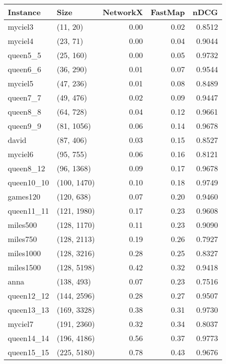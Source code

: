 \begin{tabular}{llrrr}
\toprule
  Instance &         Size &  NetworkX &  FastMap &   nDCG \\
\midrule
   myciel3 &     (11, 20) &      0.00 &     0.02 & 0.8512 \\
   myciel4 &     (23, 71) &      0.00 &     0.04 & 0.9044 \\
  queen5\_5 &    (25, 160) &      0.00 &     0.05 & 0.9732 \\
  queen6\_6 &    (36, 290) &      0.01 &     0.07 & 0.9544 \\
   myciel5 &    (47, 236) &      0.01 &     0.08 & 0.8489 \\
  queen7\_7 &    (49, 476) &      0.02 &     0.09 & 0.9447 \\
  queen8\_8 &    (64, 728) &      0.04 &     0.12 & 0.9661 \\
  queen9\_9 &   (81, 1056) &      0.06 &     0.14 & 0.9678 \\
     david &    (87, 406) &      0.03 &     0.15 & 0.8527 \\
   myciel6 &    (95, 755) &      0.06 &     0.16 & 0.8121 \\
 queen8\_12 &   (96, 1368) &      0.09 &     0.17 & 0.9678 \\
queen10\_10 &  (100, 1470) &      0.10 &     0.18 & 0.9749 \\
  games120 &   (120, 638) &      0.07 &     0.20 & 0.9460 \\
queen11\_11 &  (121, 1980) &      0.17 &     0.23 & 0.9608 \\
  miles500 &  (128, 1170) &      0.11 &     0.23 & 0.9090 \\
  miles750 &  (128, 2113) &      0.19 &     0.26 & 0.7927 \\
 miles1000 &  (128, 3216) &      0.28 &     0.25 & 0.8327 \\
 miles1500 &  (128, 5198) &      0.42 &     0.32 & 0.9418 \\
      anna &   (138, 493) &      0.07 &     0.23 & 0.7516 \\
queen12\_12 &  (144, 2596) &      0.28 &     0.27 & 0.9507 \\
queen13\_13 &  (169, 3328) &      0.38 &     0.31 & 0.9730 \\
   myciel7 &  (191, 2360) &      0.32 &     0.34 & 0.8037 \\
queen14\_14 &  (196, 4186) &      0.56 &     0.37 & 0.9773 \\
queen15\_15 &  (225, 5180) &      0.78 &     0.43 & 0.9676 \\

\end{tabular}
